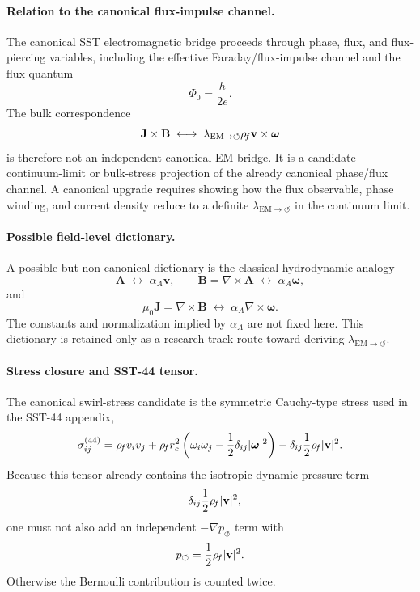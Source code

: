 \paragraph{Relation to the canonical flux-impulse channel.}
The canonical SST electromagnetic bridge proceeds through phase, flux, and
flux-piercing variables, including the effective Faraday/flux-impulse
channel and the flux quantum
\[
\Phi_0=\frac{h}{2e}.
\]
The bulk correspondence
\[
\mathbf J\times\mathbf B
\;\longleftrightarrow\;
\lambda_{\mathrm{EM}\to\circlearrowleft}
\rho_{\!f}\mathbf v\times\boldsymbol{\omega}
\]
is therefore not an independent canonical EM bridge.  It is a candidate
continuum-limit or bulk-stress projection of the already canonical
phase/flux channel.  A canonical upgrade requires showing how the flux
observable, phase winding, and current density reduce to a definite
\(\lambda_{\mathrm{EM}\to\circlearrowleft}\) in the continuum limit.

\paragraph{Possible field-level dictionary.}
A possible but non-canonical dictionary is the classical hydrodynamic analogy
\[
\mathbf A
\;\longleftrightarrow\;
\alpha_A\mathbf v,
\qquad
\mathbf B=\nabla\times\mathbf A
\;\longleftrightarrow\;
\alpha_A\boldsymbol{\omega},
\]
and
\[
\mu_0\mathbf J
=
\nabla\times\mathbf B
\;\longleftrightarrow\;
\alpha_A\nabla\times\boldsymbol{\omega}.
\]
The constants and normalization implied by
\(\alpha_A\) are not fixed here.  This dictionary is retained only as a
research-track route toward deriving
\(\lambda_{\mathrm{EM}\to\circlearrowleft}\).

\paragraph{Stress closure and SST-44 tensor.}
The canonical swirl-stress candidate is the symmetric Cauchy-type stress
used in the SST-44 appendix,
\[
\sigma^{(44)}_{ij}
=
\rho_{\!f} v_i v_j
+
\rho_{\!f} r_c^2
\left(
\omega_i\omega_j-\frac12\delta_{ij}|\boldsymbol{\omega}|^2
\right)
-
\delta_{ij}\frac12\rho_{\!f}|\mathbf v|^2 .
\]
Because this tensor already contains the isotropic dynamic-pressure term
\[
-\delta_{ij}\frac12\rho_{\!f}|\mathbf v|^2,
\]
one must not also add an independent
\(-\nabla p_{\circlearrowleft}\) term with
\[
p_{\circlearrowleft}
=
\frac12\rho_{\!f}|\mathbf v|^2 .
\]
Otherwise the Bernoulli contribution is counted twice.

